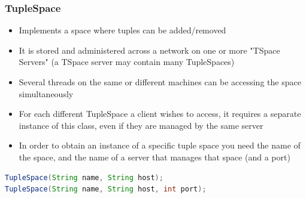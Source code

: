 \documentclass[10pt]{article}
\begin{document}
\subsubsection{TupleSpace}
\begin{itemize}
	\item Implements a space where tuples can be added/removed
	\item It is stored and administered across a network on one or more "TSpace Servers" (a TSpace server may contain many TupleSpaces)
	\item Several threads on the same or different machines can be accessing the space simultaneously
	\item For each different TupleSpace a client wishes to access, it requires a separate instance of this class, even if they are managed by the same server
	\item In order to obtain an instance of a specific tuple space you need the name of the space, and the name of a server that manages that space (and a port)
\end{itemize}
\begin{lstlisting}[language=Java, caption=TupleSace, style=JavaStyle]
TupleSpace(String name, String host);
TupleSpace(String name, String host, int port);
\end{lstlisting}
\end{document}
